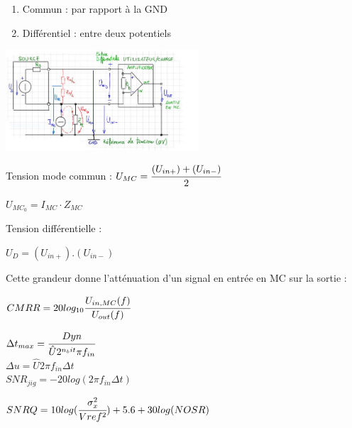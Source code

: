 
\begin{enumerate}
    \item Commun : par rapport à la GND
    \item Différentiel : entre deux potentiels 
\end{enumerate}



\vspace{-5mm}

\begin{center}
    \includegraphics[width = 0.54\textwidth]{img/Schéma.JPG}
\end{center}

Tension mode commun : 
{\hfill$ U_{MC}  = \cfrac{(U_{in+})+(U_{in-})}{2}$ \hfill}

{\hfill$ U_{MC_0}  = I_{MC} \cdot Z_{MC}$ \hfill}

Tension différentielle : 

{\hfill$ U_{D}  = (U_{in+}).(U_{in-})$ \hfill}


Cette grandeur donne l’atténuation d’un signal en entrée en MC sur la sortie :

{\hfill$ CMRR = 20log_{10}\cfrac{U_{in,MC}(f)}{U_{out}(f)}$ \hfill}

\hformbar


$\Delta t_{max} = \cfrac{Dyn}{\hat{U} 2^{n_bit} \pi f_{in}}$\\

$\Delta u =  \hat{U}2 \pi f_{in} \Delta t $  \\

$SNR_{jig} = -20log(2 \pi f_{in} \Delta t)$




$SNRQ = 10log(\cfrac{\sigma_x^2}{Vref^2})+ 5.6 + 30log(NOSR)$



